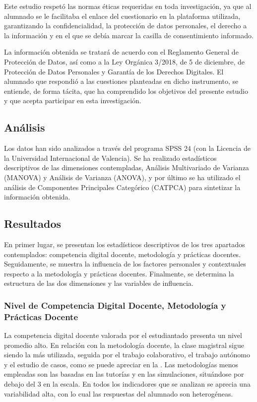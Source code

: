 \documentclass[spanish]{textolivre}
\begin{document}
Este estudio respetó las normas éticas requeridas en toda investigación, ya que al alumnado se le facilitaba el enlace del cuestionario en la plataforma utilizada, garantizando la confidencialidad, la protección de datos personales, el derecho a la información y en el que se debía marcar la casilla de consentimiento informado.

La información obtenida se tratará de acuerdo con el Reglamento General de Protección de Datos, así como a la Ley Orgánica 3/2018, de 5 de diciembre, de Protección de Datos Personales y Garantía de los Derechos Digitales. El alumnado que respondió a las cuestiones planteadas en dicho instrumento, se entiende, de forma tácita, que ha comprendido los objetivos del presente estudio y que acepta participar en esta investigación.

\subsection{Análisis}\label{sec-analisis}

Los datos han sido analizados a través del programa SPSS 24 (con la Licencia de la Universidad Internacional de Valencia). Se ha realizado estadísticos descriptivos de las dimensiones contempladas, Análisis Multivariado de Varianza (MANOVA) y Análisis de Varianza (ANOVA), y por último se ha utilizado el análisis de Componentes Principales Categórico (CATPCA) para sintetizar la información obtenida.

\subsection{Resultados}\label{sec-resultados}

En primer lugar, se presentan los estadísticos descriptivos de los tres apartados contemplados: competencia digital docente, metodología y prácticas docentes. Seguidamente, se muestra la influencia de los factores personales y contextuales respecto a la metodología y prácticas docentes. Finalmente, se determina la estructura de las dos dimensiones y las variables de influencia.

\subsubsection{Nivel de Competencia Digital Docente, Metodología y Prácticas Docente}
La competencia digital docente valorada por el estudiantado presenta un nivel promedio alto. En relación con la metodología docente, la clase magistral sigue siendo la más utilizada, seguida por el trabajo colaborativo, el trabajo autónomo y el estudio de casos, como se puede apreciar en la . Las metodologías menos empleadas son las basadas en las tutorías y en las simulaciones, situándose por debajo del 3 en la escala.  En todos los indicadores que se analizan se aprecia una variabilidad alta, con lo cual las respuestas del alumnado son heterogéneas.
\end{document}
